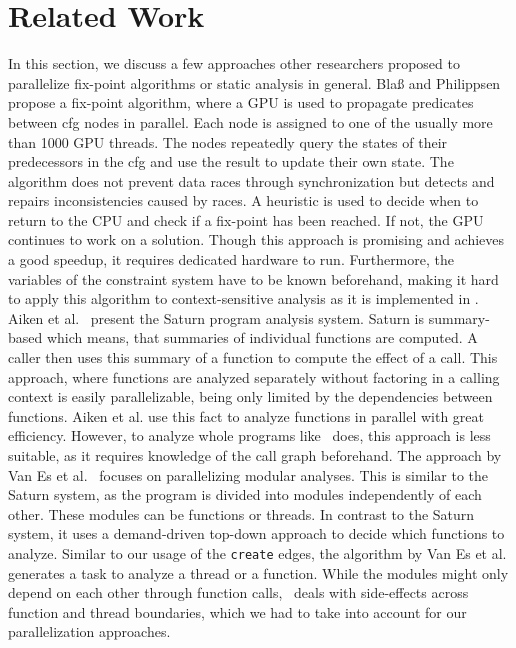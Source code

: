 \section{Related Work}
\label{sec:relatedWork}
In this section, we discuss a few approaches other researchers proposed to parallelize fix-point algorithms or static analysis in general.
Blaß and Philippsen~\cite{blass2019gpu} propose a fix-point algorithm, where a GPU is used to propagate predicates between \ac{cfg} nodes in parallel. Each node is assigned to one of the usually more than 1000 GPU threads. The nodes repeatedly query the states of their predecessors in the \ac{cfg} and use the result to update their own state. The algorithm does not prevent data races through synchronization but detects and repairs inconsistencies caused by races. A heuristic is used to decide when to return to the CPU and check if a fix-point has been reached. If not, the GPU continues to work on a solution. Though this approach is promising and achieves a good speedup, it requires dedicated hardware to run. Furthermore, the variables of the constraint system have to be known beforehand, making it hard to apply this algorithm to context-sensitive analysis as it is implemented in \gob.
Aiken et al.~\cite{aiken2007overview} present the Saturn program analysis system. Saturn is summary-based which means, that summaries of individual functions are computed. A caller then uses this summary of a function to compute the effect of a call. This approach, where functions are analyzed separately without factoring in a calling context is easily parallelizable, being only limited by the dependencies between functions. Aiken et al. use this fact to analyze functions in parallel with great efficiency. However, to analyze whole programs like \gob\ does, this approach is less suitable, as it requires knowledge of the call graph beforehand.
The approach by Van Es et al.~\cite{van2020parallel} focuses on parallelizing modular analyses. This is similar to the Saturn system, as the program is divided into modules independently of each other. These modules can be functions or threads. In contrast to the Saturn system, it uses a demand-driven top-down approach to decide which functions to analyze. Similar to our usage of the \texttt{create} edges, the algorithm by Van Es et al. generates a task to analyze a thread or a function. While the modules might only depend on each other through function calls, \gob\ deals with side-effects across function and thread boundaries, which we had to take into account for our parallelization approaches.
